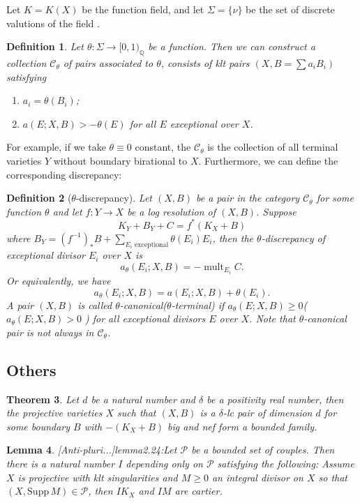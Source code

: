 \documentclass{article}
\newtheorem{defn}{Definition}[subsection]
\newtheorem{lem}[defn]{Lemma}
\newtheorem{thm}[defn]{Theorem}
\begin{document}
Let $ K=K(X) $ be the function field, and let $ \Sigma=\{\nu\} $ be the set of discrete valutions of the field . 
\begin{defn}\label{thetacategory}
  \cite[Definition 3.5]{brunoLogSarkisovProgram1995}
  Let  $\theta:\Sigma\to [0,1)_\mathbb{Q}$ be a function. Then we can construct a collection $ \mathcal{C}_\theta $ of pairs  associated to $ \theta $, consists of klt pairs $ (X,B=\sum a_iB_i) $ satisfying
  \begin{enumerate}
    \item $ a_i=\theta(B_i) $;
    \item $ a(E;X,B)>-\theta(E) $ for all $ E $ exceptional over $ X $.
  \end{enumerate} 
\end{defn}
For example, if we take $\theta \equiv 0$ constant, the $\mathcal{C}_{\theta}$ is the collection of all terminal varieties $Y$ without boundary birational to $X$. Furthermore, we can define the corresponding discrepancy:
\begin{defn}[$\theta$-discrepancy]
  Let $(X,B)$ be a pair in the category $\mathcal{C}_{\theta}$ for some function $\theta$ and let  $f:Y\to X$ be a log resolution of $(X,B)$. Suppose
  \[
  K_{Y}+B_{Y}+C=f^*(K_{X}+B)
  \]
  where $B_{Y}=(f^{-1})_*B+ \sum_{E_{i}\text{ exceptional}} \theta(E_{i})E_{i}$, then the $\theta$-discrepancy  of exceptional divisor $E_{i}$ over $X$ is 
  \[
    a_{\theta}(E_{i};X,B)=-\operatorname{mult}_{E_{i}}C.
  \]
 Or equivalently, we have 
 \[
    a_{\theta}(E_{i};X,B)=a(E_{i};X,B)+\theta(E_{i}).
 \]
A pair $(X,B)$ is called $\theta$-canonical($\theta$-terminal) if $a_{\theta}(E;X,B)\geqslant 0$($a_{\theta}(E;X,B)> 0$ ) for all exceptional  divisors $E$ over $X$.  Note that $\theta$-canonical pair is not always in $\mathcal{C}_{\theta}$.
\end{defn}


\subsection{Others}

\begin{thm}\label{BAB}
  Let $ d $ be a natural number and $ \delta $ be a positivity real number, then the projective varieties $ X $ such that $ (X,B) $ is a $ \delta $-lc pair of dimension $ d $ for some boundary $ B $ with $ -(K_X+B) $ big  and nef form a bounded family.
\end{thm}
\begin{lem}\label{effeciveindex}
  [Anti-pluri...]lemma2.24:Let $ \mathcal{P} $ be  a bounded set of couples. Then there is  a natural number $ I $ depending only on $ \mathcal{P} $ satisfying the following: Assume $ X $ is projective with klt singularities and $ M\geqslant 0 $ an integral divisor on $ X $ so that $ (X,\mathrm{Supp}\, M)\in \mathcal{P} $, then $ IK_X $ and $ IM $ are cartier.
\end{lem}
\end{document}
